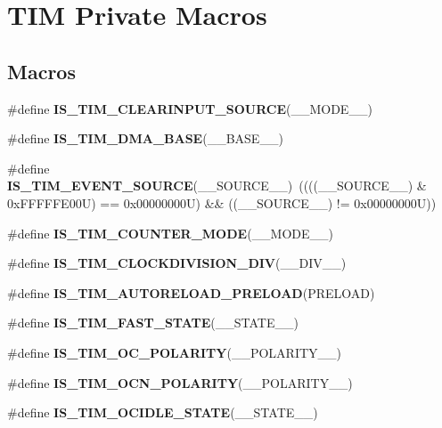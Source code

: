 \hypertarget{group___t_i_m___private___macros}{}\section{T\+IM Private Macros}
\label{group___t_i_m___private___macros}
\subsection*{Macros}
\begin{DoxyCompactItemize}
\item 
\#define {\bfseries I\+S\+\_\+\+T\+I\+M\+\_\+\+C\+L\+E\+A\+R\+I\+N\+P\+U\+T\+\_\+\+S\+O\+U\+R\+CE}(\+\_\+\+\_\+\+M\+O\+D\+E\+\_\+\+\_\+)
\item 
\#define {\bfseries I\+S\+\_\+\+T\+I\+M\+\_\+\+D\+M\+A\+\_\+\+B\+A\+SE}(\+\_\+\+\_\+\+B\+A\+S\+E\+\_\+\+\_\+)
\item 
\mbox{\label{group___t_i_m___private___macros_gae4a44eb3977f1cba86a9179c8c7f6b36}} 
\#define {\bfseries I\+S\+\_\+\+T\+I\+M\+\_\+\+E\+V\+E\+N\+T\+\_\+\+S\+O\+U\+R\+CE}(\+\_\+\+\_\+\+S\+O\+U\+R\+C\+E\+\_\+\+\_\+)~((((\+\_\+\+\_\+\+S\+O\+U\+R\+C\+E\+\_\+\+\_\+) \& 0x\+F\+F\+F\+F\+F\+E00\+U) == 0x00000000\+U) \&\& ((\+\_\+\+\_\+\+S\+O\+U\+R\+C\+E\+\_\+\+\_\+) != 0x00000000\+U))
\item 
\#define {\bfseries I\+S\+\_\+\+T\+I\+M\+\_\+\+C\+O\+U\+N\+T\+E\+R\+\_\+\+M\+O\+DE}(\+\_\+\+\_\+\+M\+O\+D\+E\+\_\+\+\_\+)
\item 
\#define {\bfseries I\+S\+\_\+\+T\+I\+M\+\_\+\+C\+L\+O\+C\+K\+D\+I\+V\+I\+S\+I\+O\+N\+\_\+\+D\+IV}(\+\_\+\+\_\+\+D\+I\+V\+\_\+\+\_\+)
\item 
\#define {\bfseries I\+S\+\_\+\+T\+I\+M\+\_\+\+A\+U\+T\+O\+R\+E\+L\+O\+A\+D\+\_\+\+P\+R\+E\+L\+O\+AD}(P\+R\+E\+L\+O\+AD)
\item 
\#define {\bfseries I\+S\+\_\+\+T\+I\+M\+\_\+\+F\+A\+S\+T\+\_\+\+S\+T\+A\+TE}(\+\_\+\+\_\+\+S\+T\+A\+T\+E\+\_\+\+\_\+)
\item 
\#define {\bfseries I\+S\+\_\+\+T\+I\+M\+\_\+\+O\+C\+\_\+\+P\+O\+L\+A\+R\+I\+TY}(\+\_\+\+\_\+\+P\+O\+L\+A\+R\+I\+T\+Y\+\_\+\+\_\+)
\item 
\#define {\bfseries I\+S\+\_\+\+T\+I\+M\+\_\+\+O\+C\+N\+\_\+\+P\+O\+L\+A\+R\+I\+TY}(\+\_\+\+\_\+\+P\+O\+L\+A\+R\+I\+T\+Y\+\_\+\+\_\+)
\item 
\#define {\bfseries I\+S\+\_\+\+T\+I\+M\+\_\+\+O\+C\+I\+D\+L\+E\+\_\+\+S\+T\+A\+TE}(\+\_\+\+\_\+\+S\+T\+A\+T\+E\+\_\+\+\_\+)

\end{DoxyCompactItemize}
